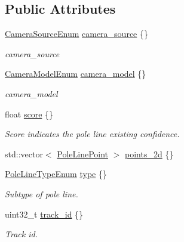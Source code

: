 \subsection*{Public Attributes}
\begin{DoxyCompactItemize}
\item 
\hyperlink{structmaf__perception__interface_1_1CameraSourceEnum}{Camera\+Source\+Enum} \hyperlink{structmaf__perception__interface_1_1PoleLine_a3bb2c2d544a149a6214ba2775d057056}{camera\+\_\+source} \{\}
\begin{DoxyCompactList}\small\item\em camera\+\_\+source \end{DoxyCompactList}\item 
\hyperlink{structmaf__perception__interface_1_1CameraModelEnum}{Camera\+Model\+Enum} \hyperlink{structmaf__perception__interface_1_1PoleLine_a8720dfe07f79b42d89914b968c1f8320}{camera\+\_\+model} \{\}
\begin{DoxyCompactList}\small\item\em camera\+\_\+model \end{DoxyCompactList}\item 
float \hyperlink{structmaf__perception__interface_1_1PoleLine_adb61609ad74ccf44dd2f8bb682f146dd}{score} \{\}
\begin{DoxyCompactList}\small\item\em Score indicates the pole line existing confidence. \end{DoxyCompactList}\item 
std\+::vector$<$ \hyperlink{structmaf__perception__interface_1_1PoleLinePoint}{Pole\+Line\+Point} $>$ \hyperlink{structmaf__perception__interface_1_1PoleLine_abe34473ab3705e462865c63941124705}{points\+\_\+2d} \{\}
\item 
\hyperlink{structmaf__perception__interface_1_1PoleLineTypeEnum}{Pole\+Line\+Type\+Enum} \hyperlink{structmaf__perception__interface_1_1PoleLine_a51a0cd1589106801f44b21b730987d79}{type} \{\}
\begin{DoxyCompactList}\small\item\em Subtype of pole line. \end{DoxyCompactList}\item 
uint32\+\_\+t \hyperlink{structmaf__perception__interface_1_1PoleLine_aff04b8cc27785f6323f9e9a4d3a80b99}{track\+\_\+id} \{\}
\begin{DoxyCompactList}\small\item\em Track id. \end{DoxyCompactList}\end{DoxyCompactItemize}


